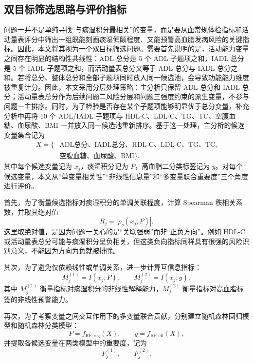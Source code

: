 \documentclass{MathorCupmodeling}
\begin{document}
			\subsection{双目标筛选思路与评价指标}
				问题一并不是单纯寻找“与痰湿积分最相关”的变量，而是要从血常规体检指标和活动量表评分中筛出一组既能刻画痰湿偏颇程度、又能预警高血脂发病风险的关键指标。因此，本文将其视为一个双目标筛选问题。需要首先说明的是，活动能力变量之间存在明显的结构性共线性：ADL 总分是 5 个 ADL 子题项之和，IADL 总分是 5 个 IADL 子题项之和，而活动量表总分又等于 ADL 总分与 IADL 总分之和。若将总分、整体总分和全部子题项同时放入同一候选池，会导致功能能力维度被重复计分。因此，本文采用分层处理策略：主分析只保留 ADL 总分和 IADL 总分；活动量表总分作为后续问题二风险分层和问题三强度约束的派生变量，不参与问题一主排序。同时，为了检验是否存在某个子题项能够明显优于总分变量，补充分析中再将 10 个 ADL/IADL 子题项与 HDL-C、LDL-C、TG、TC、空腹血糖、血尿酸、BMI 一并放入同一候选池重新排序。基于这一处理，主分析的候选变量集合记为
			\begin{equation}
				\begin{aligned}
					X=\{&\text{ADL总分、IADL总分、HDL-C、LDL-C、TG、TC},\\
					&\text{空腹血糖、血尿酸、BMI}\}.
				\end{aligned}
			\end{equation}
			其中每个候选变量记为 $x_j$，痰湿积分记为 $P$，高血脂二分类标签记为 $y$。对每个候选变量，本文从“单变量相关性”“非线性信息量”和“多变量联合重要度”三个角度进行评价。
		
		首先，为了衡量候选指标对痰湿积分的单调关联程度，计算 Spearman 秩相关系数，并取其绝对值
		\begin{equation}
			R_j=\left|\rho_s(x_j,P)\right|.
		\end{equation}
		这里取绝对值，是因为问题一关心的是“关联强弱”而非“正负方向”。例如 HDL-C 或活动量表总分可能与痰湿积分呈负相关，但这类负向指标同样具有很强的风险识别意义，不能因为方向为负就被排除。
		
		其次，为了避免仅依赖线性或单调关系，进一步计算互信息指标：
		\begin{equation}
			M_j^{(1)}=I(x_j;P),\qquad M_j^{(2)}=I(x_j;y),
		\end{equation}
		其中 $M_j^{(1)}$ 衡量指标对痰湿积分的非线性解释能力，$M_j^{(2)}$ 衡量指标对高血脂标签的非线性预警能力。
		
		再次，为了考察变量之间交互作用下的多变量联合贡献，分别建立随机森林回归模型和随机森林分类模型：
		\begin{equation}
			P=f_{\text{RF-reg}}(X),\qquad y=f_{\text{RF-clf}}(X),
		\end{equation}
		并提取各候选变量在两类模型中的重要度，记为
		\begin{equation}
			F_j^{(1)},\qquad F_j^{(2)}.
		\end{equation}
		
\end{document}
